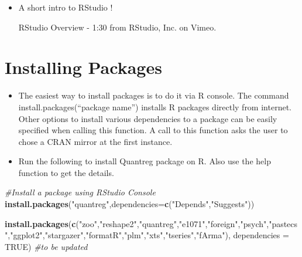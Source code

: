 \documentclass[]{book}
\newenvironment{Shaded}{\begin{snugshade}}{\end{snugshade}}
\newcommand{\KeywordTok}[1]{\textcolor[rgb]{0.13,0.29,0.53}{\textbf{#1}}}
\newcommand{\DataTypeTok}[1]{\textcolor[rgb]{0.13,0.29,0.53}{#1}}
\newcommand{\StringTok}[1]{\textcolor[rgb]{0.31,0.60,0.02}{#1}}
\newcommand{\CommentTok}[1]{\textcolor[rgb]{0.56,0.35,0.01}{\textit{#1}}}
\newcommand{\OtherTok}[1]{\textcolor[rgb]{0.56,0.35,0.01}{#1}}
\newcommand{\NormalTok}[1]{#1}
\providecommand{\tightlist}{%
  \setlength{\itemsep}{0pt}\setlength{\parskip}{0pt}}
\begin{document}
\begin{itemize}
\tightlist
\item
  A short intro to RStudio !

  RStudio Overview - 1:30 from RStudio, Inc. on Vimeo.
\end{itemize}

\section{Installing Packages}\label{installing-packages}

\begin{itemize}
\item
  The easiest way to install packages is to do it via R console. The
  command install.packages(``package name'') installs R packages
  directly from internet. Other options to install various dependencies
  to a package can be easily specified when calling this function. A
  call to this function asks the user to chose a CRAN mirror at the
  first instance.
\item
  Run the following to install Quantreg package on R. Also use the help
  function to get the details.
\end{itemize}

\begin{Shaded}
\begin{Highlighting}[]
\CommentTok{#Install a package using RStudio Console}
\KeywordTok{install.packages}\NormalTok{(}\StringTok{"quantreg"}\NormalTok{,}\DataTypeTok{dependencies=}\KeywordTok{c}\NormalTok{(}\StringTok{"Depends"}\NormalTok{,}\StringTok{"Suggests"}\NormalTok{))}
\end{Highlighting}
\end{Shaded}

\begin{Shaded}
\begin{Highlighting}[]
\KeywordTok{install.packages}\NormalTok{(}\KeywordTok{c}\NormalTok{(}\StringTok{"zoo"}\NormalTok{,}\StringTok{"reshape2"}\NormalTok{,}\StringTok{"quantreg"}\NormalTok{,}\StringTok{"e1071"}\NormalTok{,}\StringTok{"foreign"}\NormalTok{,}\StringTok{"psych"}\NormalTok{,}\StringTok{"pastecs"}\NormalTok{,}\StringTok{"ggplot2"}\NormalTok{,}\StringTok{"stargazer"}\NormalTok{,}\StringTok{"formatR"}\NormalTok{,}\StringTok{"plm"}\NormalTok{,}\StringTok{"xts"}\NormalTok{,}\StringTok{"tseries"}\NormalTok{,}\StringTok{"fArma"}\NormalTok{), }\DataTypeTok{dependencies =} \OtherTok{TRUE}\NormalTok{) }
\CommentTok{#to be updated}
\end{Highlighting}
\end{Shaded}
\end{document}
